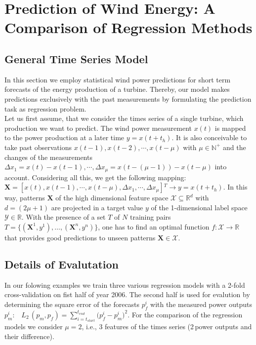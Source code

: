 \documentclass[10pt, conference, compsocconf]{IEEEtran}
\begin{document}
\section{Prediction of Wind Energy: A Comparison of Regression Methods}
\label{sec:pred}
\subsection{General Time Series Model}
In this section we employ statistical wind power predictions for short term forecasts of the energy production of a turbine. Thereby, our model makes predictions exclusively with the past measurements by formulating the prediction task as regression problem. \\
Let us first assume, that we consider the times series of a single turbine, which production we want to predict. The wind power measurement $x(t)$ is mapped to the power production at a later time \mbox{$y = x(t\!+\!t_h)$}. It is also conceivable to take past observations $x(t\!-\!1), x(t\!-\!2), \cdots, x(t\!-\!\mu)$ with $\mu \in \mathbb{N^+}$ and the changes
of the measurements \mbox{$\Delta x_{1} = x(t)-x(t\!-\!1), \cdots, \Delta x_{\mu}=x(t\!-\!(\!\mu\!-\!1))-x(t\!-\!\mu)$} into account. Considering all this, we get the following mapping:  $\mathbf{X} = [x(t), x(t\!-\!1), \cdots, x(t\!-\mu), \Delta x_{1}, \cdots, \Delta x_{\mu}]{}^{T} \longrightarrow y=x(t\!+\!t_h)$.
In this way, patterns $\mathbf{X}$ of the high dimensional feature space $\mathcal{X} \subseteq \mathbb{R}^d$ with \mbox{$d=(2\mu+1)$} are projected in a target value $y$ of the 1-dimensional label space $\mathcal{Y} \in \mathbb{R}$. With the presence of a set $T$ of $N$ training pairs \mbox{$T=\{(\mathbf{X}^1,y^1),\ldots,(\mathbf{X}^n,y^n)\}$}, one has to find an optimal function $f: \mathcal{X} \rightarrow \mathbb{R}$ that provides good predictions to unseen patterns $\mathbf{X} \in \mathcal{X}$.

\subsection{Details of Evalutation}
In our folowing examples we train three various regression models with a 2-fold cross-validation on fist half of year 2006. The second half is used for evalution by determining the square error of the forecasts $p_f^i$ with the measured power outputs $p_m^i$: \,\,  $L_2\,(p_m, p_f) = \sum_{i=t_{start}}^{t_{end}}\big(p_{f}^i-p_{m}^i\big)^2$.  
For the comparison of the regression models we consider $\mu=2$, i.e., 3 features of the times series (2\,power outputs and their difference). 
\end{document}

